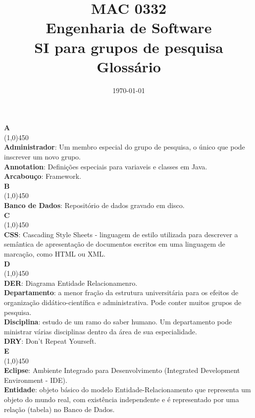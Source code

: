 \documentclass[11pt, a4paper]{article}
\title{MAC 0332\\
	Engenharia de Software\\
	SI para grupos de pesquisa\\
	Glossário}
\date{\today}
\begin{document}
	\maketitle
	\newpage

	\noindent\textbf{\huge{A}}\\
	\line(1,0){450}\\
	\textbf{Administrador}: Um membro especial do grupo de pesquisa, o único 
	que pode inscrever um novo grupo.\\
	\textbf{Annotation}: Definições especiais para variaveis e 
	classes em Java.\\
	\textbf{Arcabouço}: Framework.\\
	
	\noindent\textbf{\huge{B}}\\
	\line(1,0){450}\\
	\textbf{Banco de Dados}: Repositório de dados gravado em disco.\\

	\noindent\textbf{\huge{C}}\\
	\line(1,0){450}\\
	\textbf{CSS}: Cascading Style Sheets - linguagem de estilo utilizada para descrever a semântica de apresentação de documentos escritos em uma linguagem de marcação, como HTML ou XML.\\

	\noindent\textbf{\huge{D}}\\
	\line(1,0){450}\\
	\textbf{DER}: Diagrama Entidade Relacionamenro.\\
	\textbf{Departamento}: a menor fração da estrutura universitária para os efeitos de organização didático-científica e administrativa. Pode conter muitos grupos de pesquisa.\\
	\textbf{Disciplina}: estudo de um ramo do saber humano. Um departamento pode ministrar várias disciplinas dentro da área de sua especialidade.\\
	\textbf{DRY}: Don't Repeat Yourseft.\\
	
	\noindent\textbf{\huge{E}}\\
	\line(1,0){450}\\
	\textbf{Eclipse}: Ambiente Integrado para Desenvolvimento (Integrated Development Environment - IDE).\\
	\textbf{Entidade}: objeto básico do modelo Entidade-Relacionamento que representa um objeto do mundo real, com existência independente e é representado por uma relação (tabela) no Banco de Dados.\\
	
\end{document}
